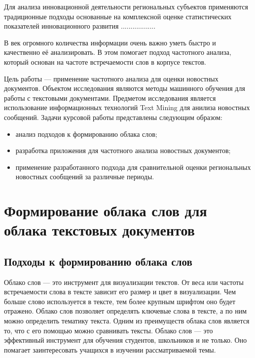 \documentclass[bachelor, och, coursework ]{SCWorks}
\begin{document}
\tableofcontents







\intro
Для анализа инновационной деятельности региональных субъектов применяются традиционные подходы основанные на комплексной оценке статистических показателей инновационного развития .................. 




В век огромного количества информации очень важно уметь быстро и качественно её анализировать. В этом помогает подход частотного анализа, который основан на частоте встречаемости слов в корпусе текстов. 

Цель работы --- применение частотного анализа для оценки новостных документов. 
Объектом исследования являются методы машинного обучения для работы с текстовыми документами.
Предметом исследования является использование информационных технологий Text Mining для анилиза новостных сообщений. 
Задачи курсовой работы представлены следующим образом:
\begin{itemize}
    \item анализ подходов к формированию облака слов;
    \item разработка приложения для частотного анализа новостных документов;
    \item применение разработанного подхода для сравнительной оценки региональных новостных сообщений за различные периоды.
\end{itemize}




\section{Формирование облака слов для облака текстовых документов}
\subsection{Подходы к формированию облака слов}

Облако слов --- это инструмент для визуализации текстов. От веса или частоты встречаемости слова в тексте зависит его размер и цвет в визуализации. Чем больше слово используется в тексте, тем более крупным шрифтом оно будет отражено. Облако слов позволяет определять ключевые слова в тексте, а по ним можно определить тематику текста.
Одним из преимуществ облака слов является то, что с его помощью можно сравнивать тексты. 
Облако слов --- это эффективный инструмент для обучения студентов, школьников и не только. Оно помагает заинтересовать учащихся в изучении рассматриваемой темы.
\end{document}
